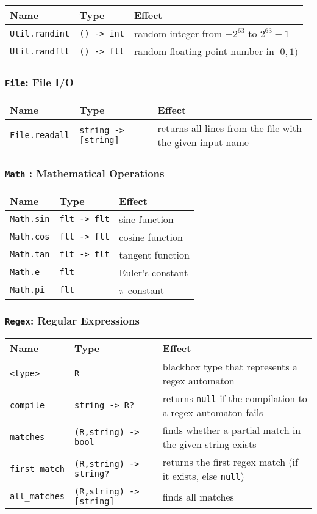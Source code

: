 \documentclass{article}
\newcommand{\code}[1]{\lstinline[columns=fixed]{#1}}
\begin{document}
				\begin{longtable}{l|l|l}
					\textbf{Name} & \textbf{Type} & \textbf{Effect} \\
					\midrule
					\code{Util.randint} & \code{() -> int} & random integer from $-2^63$ to $2^63-1$ \\
					\code{Util.randflt} & \code{() -> flt} & random floating point number in $[0,1)$
				\end{longtable}
			
			\subsubsection{\code{File}: File I/O}
			
				\begin{longtable}{l|l|l}
					\textbf{Name} & \textbf{Type} & \textbf{Effect} \\
					\midrule
					\code{File.readall} & \code{string -> [string]} & returns all lines from the file with the given input name
				\end{longtable}
			
			\subsubsection{\code{Math} : Mathematical Operations}
			
				\begin{longtable}{l|l|l}
					\textbf{Name} & \textbf{Type} & \textbf{Effect} \\
					\midrule
					\code{Math.sin} & \code{flt -> flt} & sine function \\
					\code{Math.cos} & \code{flt -> flt} & cosine function \\
					\code{Math.tan} & \code{flt -> flt} & tangent function \\
					\code{Math.e} & \code{flt} & Euler's constant \\
					\code{Math.pi} & \code{flt} & $\pi$ constant
				\end{longtable}
			
			\subsubsection{\code{Regex}: Regular Expressions}
			
				\begin{longtable}{l|l|l}
					\textbf{Name} & \textbf{Type} & \textbf{Effect} \\
					\midrule
					\code{<type>} & \code{R} & blackbox type that represents a regex automaton \\
					\code{compile} & \code{string -> R?} & returns \code{null} if the compilation to a regex automaton fails \\
					\code{matches} & \code{(R,string) -> bool} & finds whether a partial match in the given string exists \\
					\code{first_match} & \code{(R,string) -> string?} & returns the first regex match (if it exists, else \code{null}) \\
					\code{all_matches} & \code{(R,string) -> [string]} & finds all matches
				\end{longtable}
			
\end{document}
